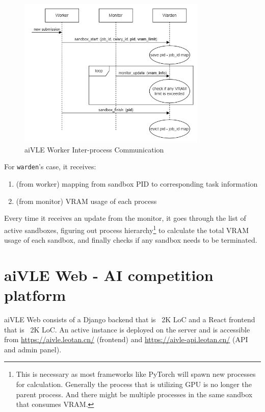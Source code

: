 \begin{figure}[H]
    \centering
    \includegraphics[width=0.8\textwidth]{images/aivle-worker-ipc.png}
    \caption{aiVLE Worker Inter-process Communication}
    \label{fig:aivle-worker-ipc}
\end{figure}

For \texttt{warden}'s case, it receives:
\begin{enumerate}
    \item (from worker) mapping from sandbox PID to corresponding task information
    \item (from monitor) VRAM usage of each process
\end{enumerate}
Every time it receives an update from the monitor, it goes through the list of active sandboxes, figuring out process hierarchy\footnote{This is necessary as most frameworks like PyTorch will spawn new processes for calculation. Generally the process that is utilizing GPU is no longer the parent process. And there might be multiple processes in the same sandbox that consumes VRAM.} to calculate the total VRAM usage of each sandbox, and finally checks if any sandbox needs to be terminated.


\section{aiVLE Web - AI competition platform}
\label{ch:aivle-web}
aiVLE Web consists of a Django backend that is ~2K LoC and a React frontend that is ~2K LoC. An active instance is deployed on the server and is accessible from \href{https://aivle.leotan.cn/}{https://aivle.leotan.cn/} (frontend) and \href{https://aivle-api.leotan.cn/}{https://aivle-api.leotan.cn/} (API and admin panel).

